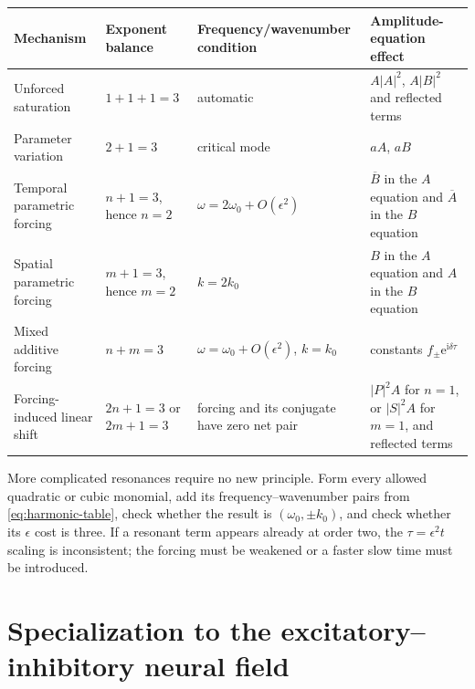 \documentclass[11pt]{article}
\newcommand{\ii}{\mathrm{i}}
\newcommand{\ee}{\mathrm{e}}
\begin{document}
\begin{center}
\begin{tabular}{@{}L{0.22\textwidth}L{0.19\textwidth}L{0.24\textwidth}L{0.24\textwidth}@{}}
\toprule
Mechanism & Exponent balance & Frequency/wavenumber condition & Amplitude-equation effect \\
\midrule
Unforced saturation & $1+1+1=3$ & automatic & $A|A|^2$, $A|B|^2$ and reflected terms \\
Parameter variation & $2+1=3$ & critical mode & $aA$, $aB$ \\
Temporal parametric forcing & $n+1=3$, hence $n=2$ & $\omega=2\omega_0+O(\epsilon^2)$ & $\overline B$ in the $A$ equation and $\overline A$ in the $B$ equation \\
Spatial parametric forcing & $m+1=3$, hence $m=2$ & $k=2k_0$ & $B$ in the $A$ equation and $A$ in the $B$ equation \\
Mixed additive forcing & $n+m=3$ & $\omega=\omega_0+O(\epsilon^2)$, $k=k_0$ & constants $f_\pm\ee^{\ii\delta\tau}$ \\
Forcing-induced linear shift & $2n+1=3$ or $2m+1=3$ & forcing and its conjugate have zero net pair & $|P|^2A$ for $n=1$, or $|S|^2A$ for $m=1$, and reflected terms \\
\bottomrule
\end{tabular}
\end{center}

More complicated resonances require no new principle.  Form every allowed
quadratic or cubic monomial, add its frequency--wavenumber pairs from
\eqref{eq:harmonic-table}, check whether the result is
$(\omega_0,\pm k_0)$, and check whether its $\epsilon$ cost is three.  If a
resonant term appears already at order two, the $\tau=\epsilon^2t$ scaling is
inconsistent; the forcing must be weakened or a faster slow time must be
introduced.

\section{Specialization to the excitatory--inhibitory neural field}
\end{document}
